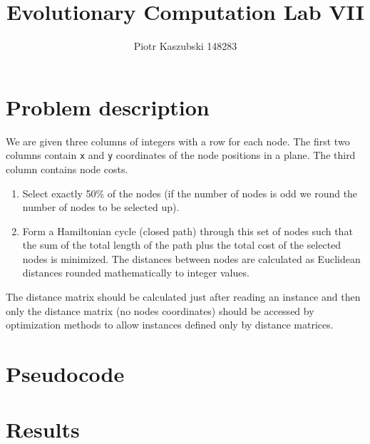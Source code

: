 \documentclass[14pt]{article}
\title{Evolutionary Computation Lab VII}
\author{Piotr Kaszubski 148283}
\date{}
\begin{document}
\maketitle
\tableofcontents
\newpage

\section{Problem description}
We are given three columns of integers with a row for each node. The first two
columns contain \verb`x` and \verb`y` coordinates of the node positions in a
plane. The third column contains node costs.

\begin{enumerate}
	\item Select exactly 50\% of the nodes (if the number of nodes is odd we
		round the number of nodes to be selected up).
	\item Form a Hamiltonian cycle (closed path) through this set of nodes such
		that the sum of the total length of the path plus the total cost of the
		selected nodes is minimized. The distances between nodes are calculated
		as Euclidean distances rounded mathematically to integer values.
\end{enumerate}

The distance matrix should be calculated just after reading an instance and
then only the distance matrix (no nodes coordinates) should be accessed by
optimization methods to allow instances defined only by distance matrices.

\section{Pseudocode}

\section{Results}
\end{document}
